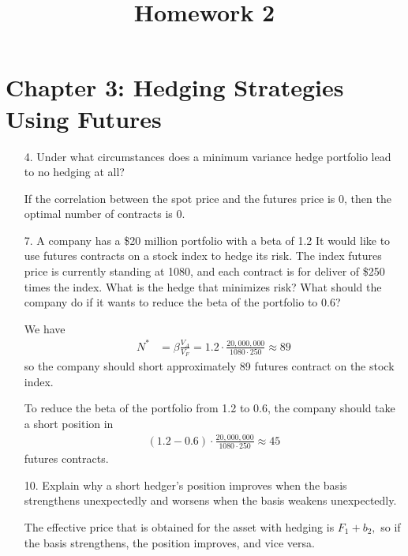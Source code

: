 \documentclass{article}
\begin{document}
\title{Homework 2}
\maketitle
\thispagestyle{fancy}

\section*{Chapter 3: Hedging Strategies Using Futures}

\begin{itemize}
	\item[4.] Under what circumstances does a minimum variance hedge portfolio lead to no hedging at all?
		\begin{answer*}
			If the correlation between the spot price and the futures price is 0, then the optimal number of contracts is 0.
		\end{answer*}

	\item[7.] A company has a \$20 million portfolio with a beta of 1.2 It would like to use futures contracts on a stock index to hedge its risk. The index futures price is currently standing at 1080, and each contract is for deliver of \$250 times the index. What is the hedge that minimizes risk? What should the company do if it wants to reduce the beta of the portfolio to 0.6?
		\begin{soln}
			We have
			\begin{align*}
				N^* &= \beta\frac{V_A}{V_F} = 1.2\cdot \frac{20, 000, 000}{1080\cdot 250} \approx 89
			\end{align*}
			so the company should short approximately 89 futures contract on the stock index. 

			To reduce the beta of the portfolio from 1.2 to 0.6, the company should take a short position in
			\begin{align*}
				(1.2-0.6)\cdot \frac{20, 000, 000}{1080\cdot 250} \approx 45
			\end{align*}
			futures contracts.
		\end{soln}

	\item[10.] Explain why a short hedger's position improves when the basis strengthens unexpectedly and worsens when the basis weakens unexpectedly.
		\begin{answer*}
			The effective price that is obtained for the asset with hedging is $F_1+b_2,$ so if the basis strengthens, the position improves, and vice versa.
		\end{answer*}


\end{itemize}
\end{document}
